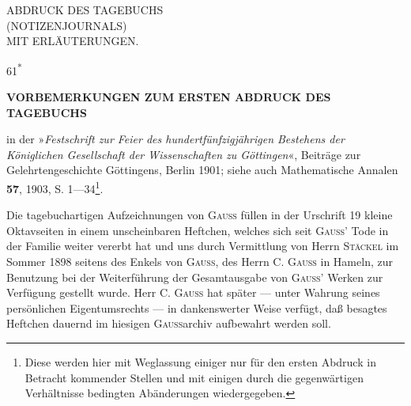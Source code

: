 \clearpage{}\NoSourceHead
{}
\vspace*{.20\textheight}
\begin{center}\Large
ABDRUCK DES TAGEBUCHS\\[5pt]
(NOTIZENJOURNALS)\\[5pt]
MIT ERLÄUTERUNGEN.
\end{center}
\vfill\noindent\hfill61\textsuperscript{*}
\clearpage{}\NoSourceHead
\begin{center}\bfseries
VORBEMERKUNGEN ZUM ERSTEN ABDRUCK DES TAGEBUCHS
\end{center}
\noindent in der »\textit{Festschrift zur Feier des hundertfünfzigjährigen Bestehens der Königlichen Gesellschaft der Wissenschaften zu Göttingen}«, Beiträge zur Gelehrtengeschichte Göttingens, Berlin 1901; siehe auch Mathematische Annalen \textbf{57}, 1903, S. 1—34\footnote{Diese  werden hier mit Weglassung einiger nur für den ersten Abdruck in Betracht kommender Stellen und mit einigen durch die gegenwärtigen Verhältnisse bedingten Abänderungen wiedergegeben.}.

\medskip
\indent Die tagebuchartigen Aufzeichnungen von \textsc{Gauss} füllen in der Urschrift 19 kleine Oktavseiten in einem unscheinbaren Heftchen, welches sich seit \textsc{Gauss}' Tode in der Familie weiter vererbt hat und uns durch Vermittlung von Herrn \textsc{Stäckel} im Sommer 1898 seitens des Enkels von \textsc{Gauss}, des Herrn C. \textsc{Gauss} in Hameln, zur Benutzung bei der Weiterführung der Gesamtausgabe von \textsc{Gauss}' Werken zur Verfügung gestellt wurde. Herr C. \textsc{Gauss} hat später — unter Wahrung seines persönlichen Eigentumsrechts — in dankenswerter Weise verfügt, daß besagtes Heftchen dauernd im hiesigen \textsc{Gauss}archiv aufbewahrt werden soll.

